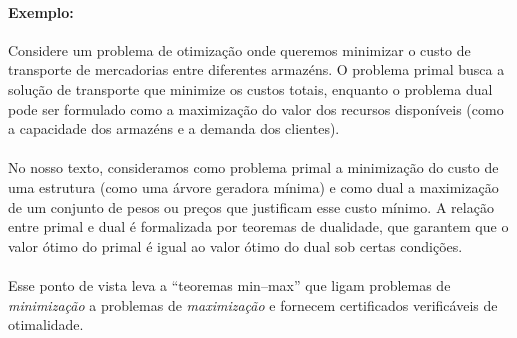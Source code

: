 \documentclass[12pt,a4paper]{article}
\begin{document}
\paragraph{Exemplo:}
Considere um problema de otimização onde queremos minimizar o custo de transporte de mercadorias entre diferentes armazéns. O problema primal busca a solução de transporte que minimize os custos totais, enquanto o problema dual pode ser formulado como a maximização do valor dos recursos disponíveis (como a capacidade dos armazéns e a demanda dos clientes).

\paragraph{}
No nosso texto, consideramos como problema primal a minimização do custo de uma estrutura (como uma árvore geradora mínima) e como dual a maximização de um conjunto de pesos ou preços que justificam esse custo mínimo. A relação entre primal e dual é formalizada por teoremas de dualidade, que garantem que o valor ótimo do primal é igual ao valor ótimo do dual sob certas condições.

\paragraph{}
Esse ponto de vista leva a “teoremas min–max” que ligam problemas de \emph{minimização} a problemas de \emph{maximização} e fornecem certificados verificáveis de otimalidade.

\begin{center}
\label{fig:min-max-cert}
\end{center}
\end{document}
